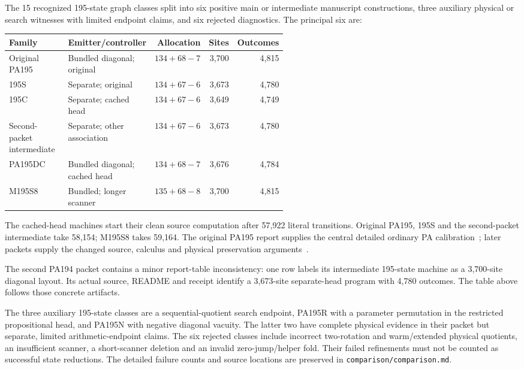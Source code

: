 \documentclass[11pt,letterpaper]{article}
\newcommand{\file}[1]{\texttt{\nolinkurl{#1}}}
\begin{document}
The 15 recognized 195-state graph classes split into six positive main
or intermediate manuscript constructions, three auxiliary physical or
search witnesses with limited endpoint claims, and six rejected
diagnostics. The principal six are:
\begin{center}\small
\begin{tabular}{@{}p{0.25\linewidth}p{0.29\linewidth}rrr@{}}
\toprule
Family & Emitter/controller & Allocation & Sites & Outcomes\\
\midrule
Original PA195 & Bundled diagonal; original & $134+68-7$&3,700&4,815\\
195S & Separate; original & $134+67-6$&3,673&4,780\\
195C & Separate; cached head & $134+67-6$&3,649&4,749\\
Second-packet intermediate & Separate; other association & $134+67-6$&3,673&4,780\\
PA195DC & Bundled diagonal; cached head & $134+68-7$&3,676&4,784\\
M195S8 & Bundled; longer scanner & $135+68-8$&3,700&4,815\\
\bottomrule
\end{tabular}
\end{center}
The cached-head machines start their clean source computation after
57,922 literal transitions. Original PA195, 195S and the second-packet
intermediate take 58,154; M195S8 takes 59,164.
The original PA195 report supplies the central detailed ordinary PA
calibration~\cite{original195}; later packets supply the changed source,
calculus and physical preservation arguments~\cite{cached195,combined195,followup195}.

The second PA194 packet contains a minor report-table inconsistency:
one row labels its intermediate 195-state machine as a 3,700-site
diagonal layout. Its actual source, README and receipt identify a
3,673-site separate-head program with 4,780 outcomes. The table above
follows those concrete artifacts.

The three auxiliary 195-state classes are a sequential-quotient search
endpoint, PA195R with a parameter permutation in the restricted
propositional head, and PA195N with negative diagonal vacuity.
The latter two have complete physical evidence in their packet but
separate, limited arithmetic-endpoint claims. The six rejected classes
include incorrect two-rotation and warm/extended physical quotients,
an insufficient scanner, a short-scanner deletion and an invalid
zero-jump/helper fold. Their failed refinements must not be counted as
successful state reductions. The detailed failure counts and source
locations are preserved in \file{comparison/comparison.md}.
\end{document}
